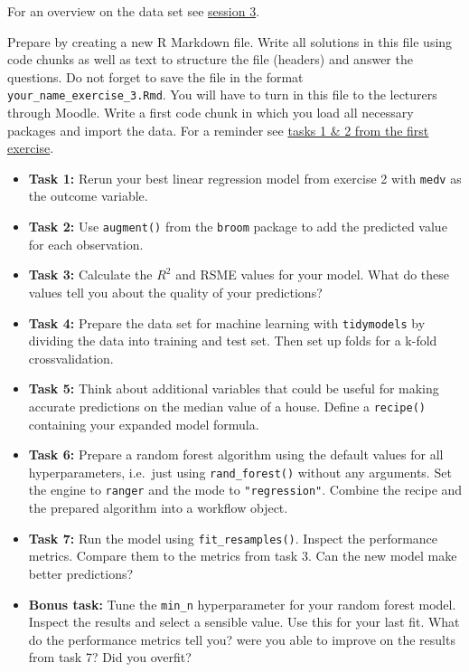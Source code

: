 \documentclass[
]{book}
\begin{document}
For an overview on the data set see \protect\hyperlink{eda-2}{session 3}.

Prepare by creating a new R Markdown file. Write all solutions in this
file using code chunks as well as text to structure the file (headers)
and answer the questions. Do not forget to save the file in the format
\texttt{your\_name\_exercise\_3.Rmd}. You will have to turn in this file to the
lecturers through Moodle. Write a first code chunk in which you load all
necessary packages and import the data. For a reminder see \protect\hyperlink{eda-2}{tasks 1 \& 2
from the first exercise}.

\begin{itemize}
\item
  \textbf{Task 1:} Rerun your best linear regression model from exercise 2
  with \texttt{medv} as the outcome variable.
\item
  \textbf{Task 2:} Use \texttt{augment()} from the \texttt{broom} package to add the
  predicted value for each observation.
\item
  \textbf{Task 3:} Calculate the \(R^2\) and RSME values for your model. What
  do these values tell you about the quality of your predictions?
\item
  \textbf{Task 4:} Prepare the data set for machine learning with
  \texttt{tidymodels} by dividing the data into training and test set. Then
  set up folds for a k-fold crossvalidation.
\item
  \textbf{Task 5:} Think about additional variables that could be useful
  for making accurate predictions on the median value of a house.
  Define a \texttt{recipe()} containing your expanded model formula.
\item
  \textbf{Task 6:} Prepare a random forest algorithm using the default
  values for all hyperparameters, i.e.~just using \texttt{rand\_forest()}
  without any arguments. Set the engine to \texttt{ranger} and the mode to
  \texttt{"regression"}. Combine the recipe and the prepared algorithm
  into a workflow object.
\item
  \textbf{Task 7:} Run the model using \texttt{fit\_resamples()}. Inspect the
  performance metrics. Compare them to the metrics from task 3. Can
  the new model make better predictions?
\item
  \textbf{Bonus task:} Tune the \texttt{min\_n} hyperparameter for your random
  forest model. Inspect the results and select a sensible value. Use
  this for your last fit. What do the performance metrics tell you?
  were you able to improve on the results from task 7? Did you overfit?
\end{itemize}
\end{document}
